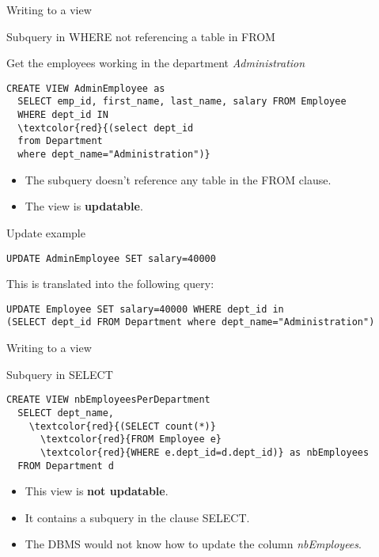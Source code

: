 \documentclass[xcolor=table]{beamer}
\begin{document}
\begin{frame}[fragile]{Writing to a view}
  \begin{block}{Subquery in WHERE not referencing a table in FROM}

Get the employees working in the department 
{\em Administration}

\footnotesize
\begin{Verbatim}[commandchars=\\\{\}]
CREATE VIEW AdminEmployee as
  SELECT emp_id, first_name, last_name, salary FROM Employee
  WHERE dept_id IN 
  \textcolor{red}{(select dept_id
  from Department
  where dept_name="Administration")}
\end{Verbatim}
\end{block}
\vfill
\begin{itemize}
  \item The subquery doesn't reference any table in the FROM clause.
  \item The view is {\bf updatable}.
\end{itemize}
\vfill
\begin{exampleblock}{Update example}
  \footnotesize
\begin{verbatim}
UPDATE AdminEmployee SET salary=40000
\end{verbatim}
This is translated into the following query:
\begin{verbatim}
UPDATE Employee SET salary=40000 WHERE dept_id in 
(SELECT dept_id FROM Department where dept_name="Administration")
\end{verbatim}
\end{exampleblock}
\end{frame}


\begin{frame}[fragile]{Writing to a view}

\begin{block}{Subquery in SELECT}
  \footnotesize
\begin{Verbatim}[commandchars=\\\{\}]
CREATE VIEW nbEmployeesPerDepartment
  SELECT dept_name, 
    \textcolor{red}{(SELECT count(*)}
      \textcolor{red}{FROM Employee e}
      \textcolor{red}{WHERE e.dept_id=d.dept_id)} as nbEmployees
  FROM Department d
\end{Verbatim}
\end{block}
\vfill
\begin{itemize}
  \item This view is {\bf not updatable}. 
  \item It contains a subquery in the clause SELECT.
  \item The DBMS would not know how to update the column {\em nbEmployees}.
\end{itemize}

\end{frame}
\end{document}
